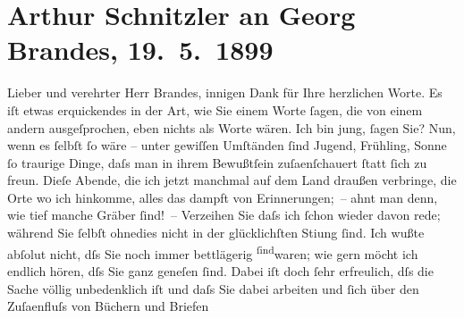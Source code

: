 

               \section[Arthur Schnitzler an Georg Brandes, 19. 5. 1899]{ Arthur Schnitzler an Georg Brandes, 19. 5. 1899}\nopagebreak{}\rehead{ }\begin{ledgroupsized}[t]{13cm}\normalsize\beginnumbering{} \toendnotes[C]{\smallbreak\pagebreak[2]} 
\toendnotes[C]{\smallbreak}\pstart{}{\pb}Lieber und verehrter Herr Brandes,\pend\pstart
           innigen Dank für Ihre herzlichen Worte. Es iſt etwas erquickendes in der Art, wie Sie
               einem Worte ſagen, die von einem andern ausgeſprochen, eben nichts als Worte wären.
               Ich bin jung, ſagen Sie? Nun, wenn es ſelbſt ſo wäre – unter gewiſſen Umſtänden ſind
               Jugend, Frühling, Sonne ſo traurige Dinge, daſs man in ihrem Bewußtſein zuſa{\geminationm}enſchauert ſtatt ſich zu {\pb}freun. Dieſe Abende, die ich jetzt manchmal auf
               dem Land draußen verbringe, die Orte wo ich hinkomme, alles das dampft von
               Erinnerungen; – ahnt man denn, wie tief manche Gräber ſind! –\pend
           \pstart
           Verzeihen Sie daſs ich ſchon wieder davon rede; während Sie ſelbſt ohnedies nicht in
               der glücklichſten Sti{\geminationm}ung ſind. Ich wußte abſolut nicht,
               dſs Sie noch immer bettläge{\pb}rig \substVorne{}\textsuperscript{ſind}\substDazwischen{}waren\substHinten{}; wie gern möcht ich endlich hören, dſs Sie ganz geneſen ſind. Dabei iſt doch
               ſehr erfreulich, dſs die Sache völlig unbedenklich iſt und daſs Sie dabei arbeiten
               und ſich über den Zuſa{\geminationm}enfluſs von Büchern und Briefen

\end{ledgroupsized}
